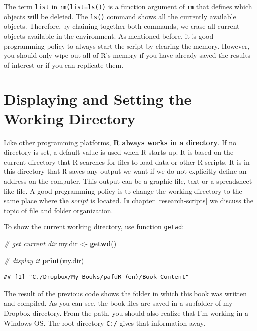 \documentclass[11pt,]{book}
\newenvironment{Shaded}{\begin{snugshade}}{\end{snugshade}}
\newcommand{\KeywordTok}[1]{\textcolor[rgb]{0.27,0.27,0.27}{\textbf{#1}}}
\newcommand{\StringTok}[1]{\textcolor[rgb]{0.5,0.5,0.5}{#1}}
\newcommand{\CommentTok}[1]{\textcolor[rgb]{0.56,0.35,0.01}{\textit{#1}}}
\newcommand{\NormalTok}[1]{#1}
\begin{document}
The term \texttt{list} in \texttt{rm(list=ls())} is a function argument
of \texttt{rm} that defines which objects will be deleted. The
\texttt{ls()} command shows all the currently available objects.
Therefore, by chaining together both commands, we erase all current
objects available in the environment. As mentioned before, it is good
programming policy to always start the script by clearing the memory.
However, you should only wipe out all of R's memory if you have already
saved the results of interest or if you can replicate them.

\section{Displaying and Setting the Working
Directory}\label{displaying-and-setting-the-working-directory}

Like other programming platforms, \textbf{R always works in a
directory}. If no directory is set, a default value is used when R
starts up. It is based on the current directory that R searches for
files to load data or other R scripts. It is in this directory that R
saves any output we want if we do not explicitly define an address on
the computer. This output can be a graphic file, text or a spreadsheet
like file. A good programming policy is to change the working directory
to the same place where the \emph{script} is located. In chapter
\ref{research-scripts} we discuss the topic of file and folder
organization.

To show the current working directory, use function \texttt{getwd}:

\begin{Shaded}
\begin{Highlighting}[]
\CommentTok{# get current dir}
\NormalTok{my.dir <-}\StringTok{ }\KeywordTok{getwd}\NormalTok{()}

\CommentTok{# display it}
\KeywordTok{print}\NormalTok{(my.dir)}
\end{Highlighting}
\end{Shaded}

\begin{verbatim}
## [1] "C:/Dropbox/My Books/pafdR (en)/Book Content"
\end{verbatim}

The result of the previous code shows the folder in which this book was
written and compiled. As you can see, the book files are saved in a
subfolder of my Dropbox directory. From the path, you should also
realize that I'm working in a Windows OS. The root directory
\texttt{C:/} gives that information away.
\end{document}
